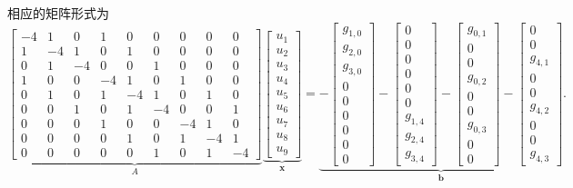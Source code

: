 {相应的矩阵形式为}
\begin{equation}\label{eq:laplace-grid-system}
\underbrace{\left[\begin{array}{rrr|rrr|rrr}
-4&1&0&1&0&0&0&0&0\\1&-4&1&0&1&0&0&0&0\\0&1&-4&0&0&1&0&0&0\\\hline
1&0&0&-4&1&0&1&0&0\\0&1&0&1&-4&1&0&1&0\\0&0&1&0&1&-4&0&0&1\\\hline
0&0&0&1&0&0&-4&1&0\\0&0&0&0&1&0&1&-4&1\\0&0&0&0&0&1&0&1&-4
\end{array}\right]}_A
\underbrace{\begin{bmatrix}u_1\\u_2\\u_3\\u_4\\u_5\\u_6\\u_7\\u_8\\u_9\end{bmatrix}}_{\boldsymbol{x}}
=\underbrace{-\begin{bmatrix}g_{1,0}\\g_{2,0}\\g_{3,0}\\0\\0\\0\\0\\0\\0\end{bmatrix}
-\begin{bmatrix}0\\0\\0\\0\\0\\0\\g_{1,4}\\g_{2,4}\\g_{3,4}\end{bmatrix}
-\begin{bmatrix}g_{0,1}\\0\\0\\g_{0,2}\\0\\0\\g_{0,3}\\0\\0\end{bmatrix}
-\begin{bmatrix}0\\0\\g_{4,1}\\0\\0\\g_{4,2}\\0\\0\\g_{4,3}\end{bmatrix}}_{\boldsymbol{b}}.
\end{equation}
